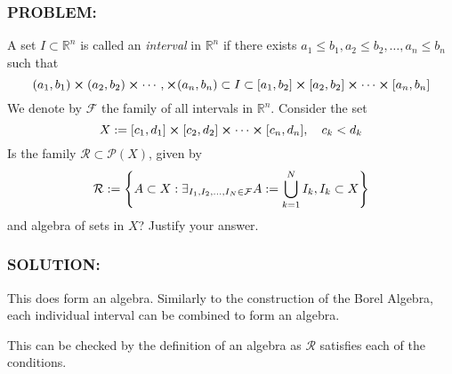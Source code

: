 \documentclass[]{article}
\newcommand{\Problem}{\subsubsection*{\textbf{PROBLEM:}}}
\newcommand{\Solution}{\subsubsection*{\textbf{SOLUTION:}}}
\newcommand{\Preliminaries}{\subsubsection*{\textbf{PRELIMINARIES:}}}
\newcommand{\R}{\mathbb{R}}
\begin{document}
\newpage
\section{}
\Problem
A set $I \subset \R^n$ is called an \emph{interval} in $\R^n$ if there exists $a_1 \leq b_1, a_2 \leq b_2, \dots, a_n \leq b_n$ such that \[
    (a_1,b_1) \cross (a_2,b_2) \cross \cdots, \cross (a_n,b_n) \subset I \subset [a_1,b_2] \cross [a_2,b_2] \cross \cdots \cross [a_n,b_n]
\]
We denote by $\mathcal{F}$ the family of all intervals in $\R^n$.
Consider the set \[
    X := [c_1,d_1] \cross [c_2,d_2] \cross \cdots \cross [c_n,d_n], \quad c_k < d_k
\]
Is the family $\mathcal{R} \subset \mathcal{P}(X)$, given by \[
    \mathcal{R} := \qty{
        A \subset X : 
        \exists_{I_1,I_2,\dots,I_N \in \mathcal{F}} A := \bigcup_{k=1}^{N} I_k, 
        I_k \subset X
    }
\] and algebra of sets in $X$? 
Justify your answer.


\Solution
This does form an algebra.
Similarly to the construction of the Borel Algebra, each individual interval can be combined to form an algebra.

This can be checked by the definition of an algebra as $\mathcal{R}$ satisfies each of the conditions. 
\end{document}
